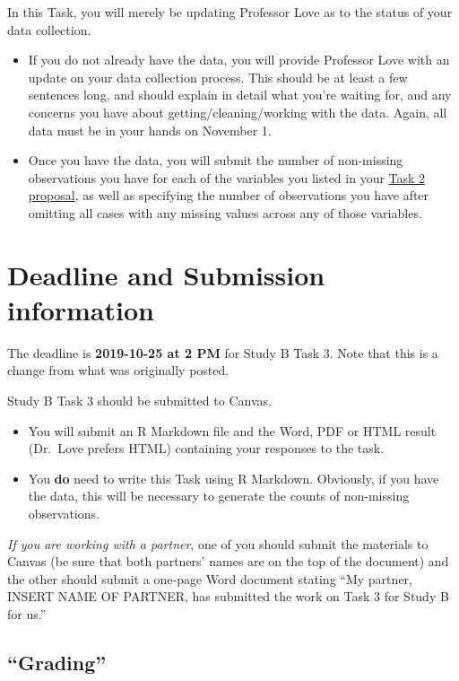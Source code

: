 \documentclass[]{book}
\providecommand{\tightlist}{%
  \setlength{\itemsep}{0pt}\setlength{\parskip}{0pt}}
\begin{document}
In this Task, you will merely be updating Professor Love as to the status of your data collection.

\begin{itemize}
\tightlist
\item
  If you do not already have the data, you will provide Professor Love with an update on your data collection process. This should be at least a few sentences long, and should explain in detail what you're waiting for, and any concerns you have about getting/cleaning/working with the data. Again, all data must be in your hands on November 1.
\item
  Once you have the data, you will submit the number of non-missing observations you have for each of the variables you listed in your \protect\hyperlink{task2}{Task 2 proposal}, as well as specifying the number of observations you have after omitting all cases with any missing values across any of those variables.
\end{itemize}

\hypertarget{deadline-and-submission-information-4}{%
\section{Deadline and Submission information}\label{deadline-and-submission-information-4}}

The deadline is \textbf{2019-10-25 at 2 PM} for Study B Task 3. Note that this is a change from what was originally posted.

Study B Task 3 should be submitted to Canvas.

\begin{itemize}
\tightlist
\item
  You will submit an R Markdown file and the Word, PDF or HTML result (Dr.~Love prefers HTML) containing your responses to the task.
\item
  You \textbf{do} need to write this Task using R Markdown. Obviously, if you have the data, this will be necessary to generate the counts of non-missing observations.
\end{itemize}

\emph{If you are working with a partner}, one of you should submit the materials to Canvas (be sure that both partners' names are on the top of the document) and the other should submit a one-page Word document stating ``My partner, INSERT NAME OF PARTNER, has submitted the work on Task 3 for Study B for us.''

\hypertarget{grading-4}{%
\subsection{``Grading''}\label{grading-4}}
\end{document}
